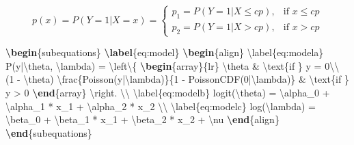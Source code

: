 \documentclass[review]{elsarticle} %
\newenvironment{Shaded}{\begin{snugshade}}{\end{snugshade}}
\newcommand{\KeywordTok}[1]{\textcolor[rgb]{0.13,0.29,0.53}{\textbf{#1}}}
\newcommand{\SpecialCharTok}[1]{\textcolor[rgb]{0.00,0.00,0.00}{#1}}
\newcommand{\SpecialStringTok}[1]{\textcolor[rgb]{0.31,0.60,0.02}{#1}}
\newcommand{\ExtensionTok}[1]{#1}
\newcommand{\NormalTok}[1]{#1}
\begin{document}
\begin{equation}
\label{eq:cutoff}
p(x) = P(Y = 1|X = x) = 
\left\{
    \begin{array}{lr}
          p_1 = P(Y = 1|X \le cp), & \text{if } x \le cp\\
          p_2 = P(Y = 1|X > cp), & \text{if } x > cp
    \end{array}
\right.
\end{equation}

\begin{Shaded}
\begin{Highlighting}[]
\KeywordTok{\textbackslash{}begin}\NormalTok{\{}\ExtensionTok{subequations}\NormalTok{\}}
  \KeywordTok{\textbackslash{}label}\NormalTok{\{}\ExtensionTok{eq:model}\NormalTok{\}}
  \KeywordTok{\textbackslash{}begin}\NormalTok{\{}\ExtensionTok{align}\NormalTok{\}}
\SpecialStringTok{  }\SpecialCharTok{\textbackslash{}label}\SpecialStringTok{\{eq:modela\}}
\SpecialStringTok{P(y|}\SpecialCharTok{\textbackslash{}theta}\SpecialStringTok{, }\SpecialCharTok{\textbackslash{}lambda}\SpecialStringTok{) = }
\SpecialCharTok{\textbackslash{}left\textbackslash{}\{}
\SpecialStringTok{    }\KeywordTok{\textbackslash{}begin}\NormalTok{\{}\ExtensionTok{array}\NormalTok{\}}\SpecialStringTok{\{lr\}}
\SpecialStringTok{       }\SpecialCharTok{\textbackslash{}theta}\SpecialStringTok{ & }\SpecialCharTok{\textbackslash{}text}\NormalTok{\{if \}}\SpecialStringTok{ y = 0}\SpecialCharTok{\textbackslash{}\textbackslash{}}
\SpecialStringTok{       (1 - }\SpecialCharTok{\textbackslash{}theta}\SpecialStringTok{) }\SpecialCharTok{\textbackslash{}frac}\SpecialStringTok{\{Poisson(y|}\SpecialCharTok{\textbackslash{}lambda}\SpecialStringTok{)\}\{1 - PoissonCDF(0|}\SpecialCharTok{\textbackslash{}lambda}\SpecialStringTok{)\} }
\SpecialStringTok{       & }\SpecialCharTok{\textbackslash{}text}\NormalTok{\{if \}}\SpecialStringTok{ y > 0}
\SpecialStringTok{    }\KeywordTok{\textbackslash{}end}\NormalTok{\{}\SpecialStringTok{array\}}
\SpecialCharTok{\textbackslash{}right}\SpecialStringTok{. }\SpecialCharTok{\textbackslash{}\textbackslash{}}
\SpecialStringTok{  }\SpecialCharTok{\textbackslash{}label}\SpecialStringTok{\{eq:modelb\}}
\SpecialStringTok{logit(}\SpecialCharTok{\textbackslash{}theta}\SpecialStringTok{) = }\SpecialCharTok{\textbackslash{}alpha}\SpecialStringTok{_0 + }\SpecialCharTok{\textbackslash{}alpha}\SpecialStringTok{_1 * x_1 + }\SpecialCharTok{\textbackslash{}alpha}\SpecialStringTok{_2 * x_2 }\SpecialCharTok{\textbackslash{}\textbackslash{}}
\SpecialStringTok{  }\SpecialCharTok{\textbackslash{}label}\SpecialStringTok{\{eq:modelc\}}
\SpecialStringTok{log(}\SpecialCharTok{\textbackslash{}lambda}\SpecialStringTok{) = }\SpecialCharTok{\textbackslash{}beta}\SpecialStringTok{_0 + }\SpecialCharTok{\textbackslash{}beta}\SpecialStringTok{_1 * x_1 + }\SpecialCharTok{\textbackslash{}beta}\SpecialStringTok{_2 * x_2 + }\SpecialCharTok{\textbackslash{}nu}
\SpecialStringTok{  }\KeywordTok{\textbackslash{}end}\NormalTok{\{}\ExtensionTok{align}\NormalTok{\}}
\KeywordTok{\textbackslash{}end}\NormalTok{\{}\ExtensionTok{subequations}\NormalTok{\}}
\end{Highlighting}
\end{Shaded}
\end{document}
